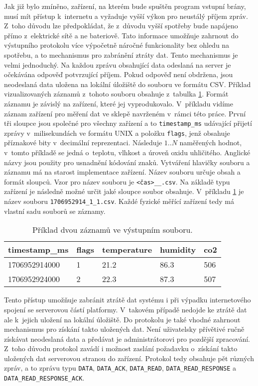Jak již bylo zmíněno, zařízení, na kterém bude spuštěn program vstupní brány, musí mít přístup k~internetu a vyžaduje vyšší výkon pro neustálý příjem zpráv. Z~toho důvodu lze předpokládat, že z~důvodu vyšší spotřeby bude napájeno přímo z~elektrické sítě a ne bateriově. Tato informace umožňuje zahrnout do výstupního protokolu více výpočetně náročné funkcionality bez ohledu na spotřebu, a to mechanismus pro zabránění ztráty dat. Tento mechanismus je velmi jednoduchý. Na každou zprávu obsahující data odeslaná na server je očekávána odpověď potvrzující příjem. Pokud odpověď není obdržena, jsou neodeslaná data uložena na lokální úložiště do souboru ve formátu CSV. Příklad vizualizovaných záznamů z~tohoto souboru obsahuje z~tabulka \ref{tab:csv_out}. Formát záznamu je závislý na zařízení, které jej vyprodukovalo. V~příkladu vidíme záznam zařízení pro měření dat ve sklepě navrženém v~rámci této práce. První tři sloupce jsou společné pro všechny zařízení a to \texttt{timestamp\_ms} udávající přijetí zprávy v~milisekundách ve formátu UNIX a položku \texttt{flags}, jenž obsahuje příznakové bity v~decimální reprezentaci. Následuje $1..N$ naměřených hodnot, v~tomto příkladě se jedná o~teplotu, vlhkost a úroveň oxidu uhličitého. Anglické názvy jsou použity pro usnadnění kódování znaků. Vytváření hlavičky souboru a záznamu má na starost implementace zařízení. Název souboru určuje obsah a formát sloupců. Vzor pro název souboru je \texttt{<čas>\_<typ zařízení>\_<číslo zařízení>.csv}. Na základě typu zařízení je následně možné určit jaké sloupce soubor obsahuje. V~příkladu \ref{tab:csv_out} je název souboru \texttt{1706952914\_1\_1.csv}. Každé fyzické měřící zařízení tedy má vlastní sadu souborů se záznamy.

\begin{table}[]
\begin{center}
\begin{tabular}{|l|l|l|l|l|}
\hline
timestamp\_ms & flags & temperature & humidity & co2 \\ \hline
1706952914000 & 1     & 21.2        & 86.3     & 506 \\ \hline
1706952924000 & 2     & 22.3        & 87.3     & 507 \\ \hline
\end{tabular}
\end{center}
\caption{Příklad dvou záznamů ve výstupním souboru.}
\label{tab:csv_out}
\end{table}

Tento přístup umožňuje zabránit ztrátě dat systému i při výpadku internetového spojení se serverovou částí platformy. V~takovém případě nedojde ke ztrátě dat ale k~jejich uložení na lokální úložiště. Do protokolu je také vhodné zahrnout mechanismus pro získání takto uložených dat. Není uživatelsky přívětivé ručně získávat neodeslaná data a předávat je administrátorovi pro pozdější zpracování. Z~toho důvodu protokol zavádí i možnost zaslání požadavku o~získání takto uložených dat serverovou stranou do zařízení. Protokol tedy obsahuje pět různých zpráv, a to zprávu typu \texttt{DATA}, \texttt{DATA\_ACK}, \texttt{DATA\_READ}, \texttt{DATA\_READ\_RESPONSE} a \texttt{DATA\_READ\_RESPONSE\_ACK}. 

